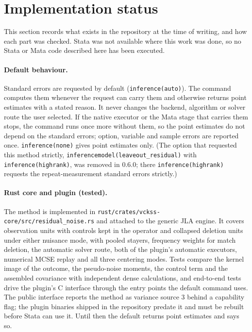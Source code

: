 \documentclass[11pt]{article}
\begin{document}
\section{Implementation status}\label{sec:status}

\begin{sloppypar}
This section records what exists in the repository at the time of
writing, and how each part was checked. Stata was not available where this
work was done, so no Stata or Mata code described here has been executed.

\paragraph{Default behaviour.} Standard errors are requested by default
(\texttt{inference(auto)}). The command computes them whenever the request
can carry them and otherwise returns point estimates with a stated reason. It
never changes the backend, algorithm or solver route the user selected. If
the native executor or the Mata stage that carries them stops, the command
runs once more without them, so the point estimates do not depend on the
standard errors; option, variable and sample errors are reported once.
\texttt{inference(none)} gives point estimates only. (The option that
requested this method strictly, \texttt{inferencemodel(leaveout\_residual)}
with \texttt{inference(highrank)}, was removed in 0.6.0; there
\texttt{inference(highrank)} requests the repeat-measurement standard errors
strictly.)

\paragraph{Rust core and plugin (tested).} The method is implemented in
\texttt{rust/\allowbreak crates/\allowbreak vckss-core/\allowbreak src/\allowbreak residual\_noise.rs} and attached to the
generic JLA engine. It covers observation units with controls kept in the
operator and collapsed deletion units under either nuisance mode, with
pooled stayers, frequency weights for match deletion, the automatic solver
route, both of the plugin's automatic executors, numerical MCSE replay and
all three centering modes. Tests compare the kernel image of the outcome, the
pseudo-noise moments, the control term and the assembled covariance with
independent dense calculations, and end-to-end tests drive the plugin's C
interface through the entry points the default command uses. The public
interface reports the method as variance source 3 behind a capability flag;
the plugin binaries shipped in the repository predate it and must be rebuilt
before Stata can use it. Until then the default returns point estimates and
says so.


\end{sloppypar}
\end{document}
